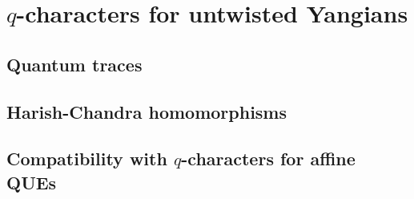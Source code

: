 \section{\texorpdfstring{$q$-characters for untwisted Yangians}{}}
    \subsection{Quantum traces}

    \subsection{Harish-Chandra homomorphisms}

    \subsection{\texorpdfstring{Compatibility with $q$-characters for affine QUEs}{}}